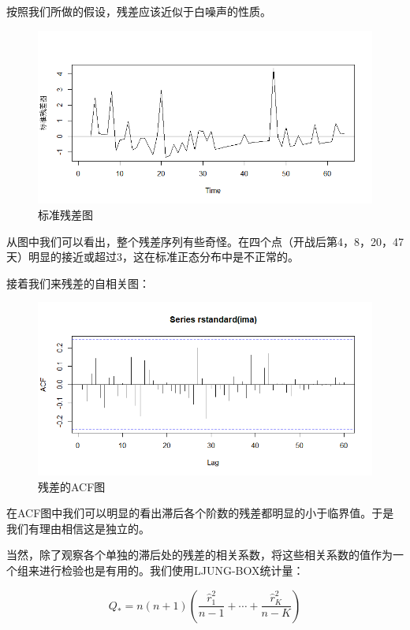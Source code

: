 \documentclass{article}
\begin{document}
	按照我们所做的假设，残差应该近似于白噪声的性质。
	

	
	\begin{figure}[h]
		\centering
		\includegraphics[width=.9\textwidth]{Rplot09.png}
		\caption{标准残差图}
	\end{figure}
	
	
	从图中我们可以看出，整个残差序列有些奇怪。在四个点（开战后第4，8，20，47天）明显的接近或超过3，这在标准正态分布中是不正常的。
	
	接着我们来残差的自相关图：
	
	
		\begin{figure}[h]
		\centering
		\includegraphics[width=.9\textwidth]{Rplot08.png}
		\caption{残差的ACF图}
	\end{figure}
	
	
	在ACF图中我们可以明显的看出滞后各个阶数的残差都明显的小于临界值。于是我们有理由相信这是独立的。
	
	当然，除了观察各个单独的滞后处的残差的相关系数，将这些相关系数的值作为一个组来进行检验也是有用的。我们使用LJUNG-BOX统计量：
	
	\begin{equation}
	Q_*=n\left( n+1 \right) \left( \frac{\widehat{r}_{1}^{2}}{n-1}+\cdots +\frac{\widehat{r}_{K}^{2}}{n-K} \right) 
	\end{equation}
	
\end{document}

